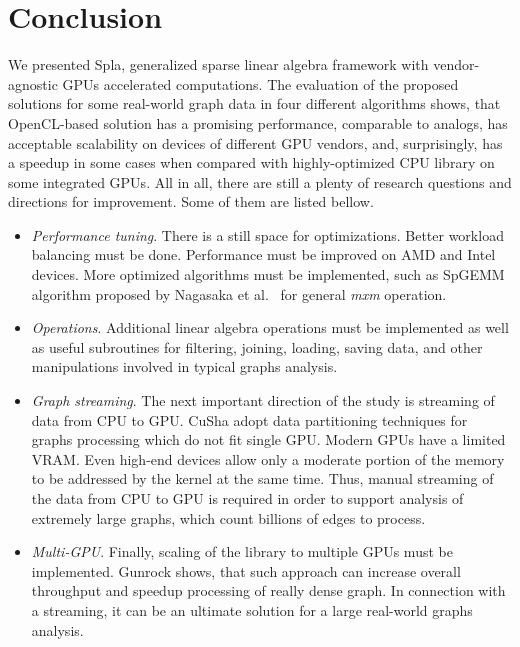 \section{Conclusion}

We presented Spla, generalized sparse linear algebra framework with vendor-agnostic GPUs accelerated computations. The evaluation of the proposed solutions for some real-world graph data in four different algorithms shows, that OpenCL-based solution has a promising performance, comparable to analogs, has acceptable scalability on devices of different GPU vendors, and, surprisingly, has a speedup in some cases when compared with highly-optimized CPU library on some integrated GPUs. All in all, there are still a plenty of research questions and directions for improvement. Some of them are listed bellow.

\begin{itemize}
    \item \textit{Performance tuning}. There is a still space for optimizations. Better workload balancing must be done. Performance must be improved on AMD and Intel devices. More optimized algorithms must be implemented, such as SpGEMM  algorithm proposed by Nagasaka et al.~\cite{8025284/spgemm/nagasaka} for general \textit{mxm} operation.
    \item \textit{Operations}. Additional linear algebra operations must be implemented as well as useful subroutines for filtering, joining, loading, saving data, and other manipulations involved in typical graphs analysis.
    \item \textit{Graph streaming}. The next important direction of the study is streaming of data from CPU to GPU. CuSha adopt data partitioning techniques for graphs processing which do not fit single GPU. Modern GPUs have a limited VRAM. Even high-end devices allow only a moderate portion of the memory to be addressed by the kernel at the same time. Thus, manual streaming of the data from CPU to GPU is required in order to support analysis of extremely large graphs, which count billions of edges to process.
    \item \textit{Multi-GPU}. Finally, scaling of the library to multiple GPUs must be implemented. Gunrock shows, that such approach can increase overall throughput and speedup processing of really dense graph. In connection with a streaming, it can be an ultimate solution for a large real-world graphs analysis.
\end{itemize}
